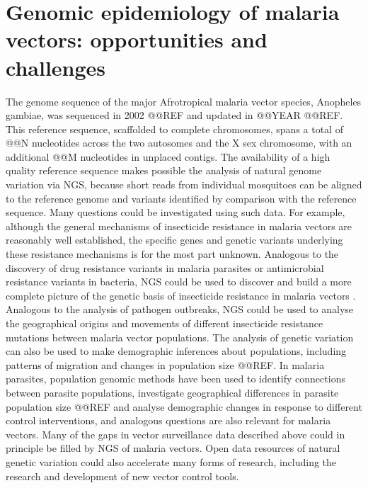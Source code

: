 \documentclass[a4paper,11pt,abstracton,hidelinks]{scrartcl}
\begin{document}
\section{Genomic epidemiology of malaria vectors: opportunities and challenges}


The genome sequence of the major Afrotropical malaria vector species, Anopheles gambiae, was sequenced in 2002 @@REF and updated in @@YEAR @@REF.
%
This reference sequence, scaffolded to complete chromosomes, spans a total of @@N nucleotides across the two autosomes and the X sex chromosome, with an additional @@M nucleotides in unplaced contigs.
%
The availability of a high quality reference sequence makes possible the analysis of natural genome variation via NGS, because short reads from individual mosquitoes can be aligned to the reference genome and variants identified by comparison with the reference sequence.
%
Many questions could be investigated using such data.
%
For example, although the general mechanisms of insecticide resistance in malaria vectors are reasonably well established, the specific genes and genetic variants underlying these resistance mechanisms is for the most part unknown.
%
Analogous to the discovery of drug resistance variants in malaria parasites or antimicrobial resistance variants in bacteria, NGS could be used to discover and build a more complete picture of the genetic basis of insecticide resistance in malaria vectors \citep{Donnelly2016}.
%
Analogous to the analysis of pathogen outbreaks, NGS could be used to analyse the geographical origins and movements of different insecticide resistance mutations between malaria vector populations.
%
The analysis of genetic variation can also be used to make demographic inferences about populations, including patterns of migration and changes in population size @@REF.
%
In malaria parasites, population genomic methods have been used to identify connections between parasite populations, investigate geographical differences in parasite population size @@REF and analyse demographic changes in response to different control interventions, and analogous questions are also relevant for malaria vectors.
%
Many of the gaps in vector surveillance data described above could in principle be filled by NGS of malaria vectors.
%
Open data resources of natural genetic variation could also accelerate many forms of research, including the research and development of new vector control tools.
\end{document}
